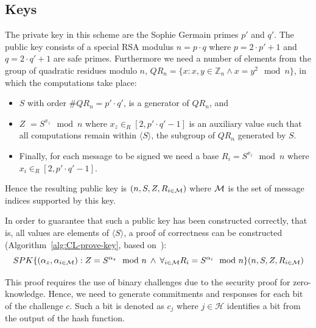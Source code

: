 \subsection{Keys}\label{sec:cl_keys}

The private key in this scheme are the Sophie Germain primes $p'$ and $q'$. The
public key consists of a special RSA modulus $n = p \cdot q$ where
$p = 2 \cdot p' + 1$ and $q = 2 \cdot q' + 1$ are safe primes. Furthermore we
need a number of elements from the group of quadratic residues modulo $n$,
$QR_n = \{ x : x,y \in \mathbb{Z}_n \land x = y^2 \mod n \}$, in which the
computations take place:
\begin{itemize}
  \item $S$ with order $\#QR_n = p' \cdot q'$, is a generator of $QR_n$, and
  \item $Z$ $= S^{x_z} \mod n$ where $x_z \in_R [2, p' \cdot q' - 1]$ is an
    auxiliary value such that all computations remain within
    $\langle S \rangle$, the subgroup of $QR_n$ generated by $S$.
  \item Finally, for each message to be signed we need a base
    $R_i = S^{x_i} \mod n$ where $x_i \in_R [2, p' \cdot q' - 1]$.
\end{itemize}
Hence the resulting public key is $(n, S, Z, R_{i \in \mathcal{M}})$ where
$\mathcal{M}$ is the set of message indices supported by this key.

In order to guarantee that such a public key has been constructed correctly,
that is, all values are elements of $\langle S \rangle$, a proof of
correctness can be constructed (Algorithm~\ref{alg:CL-prove-key}, based
on~\cite[Appendix A]{BrickellCC2004}):
\begin{equation*}
  SPK \{ (\alpha_z, \alpha_{i \in \mathcal{M}}) : Z = S^{\alpha_z} \mod n \:\land\:
    \forall_{i \in \mathcal{M}} R_i = S^{\alpha_i} \mod n \}(n, S, Z, R_{i \in \mathcal{M}})
\end{equation*}

This proof requires the use of binary challenges due to the security proof for
zero-knowledge. Hence, we need to generate commitments and responses for each
bit of the challenge $c$. Such a bit is denoted as $c_j$ where $j \in \mathcal{H}$
identifies a bit from the output of the hash function.
%
%

